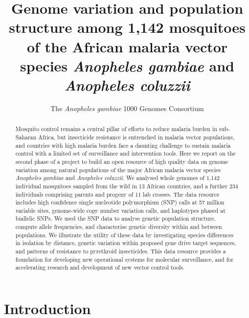 \documentclass[a4paper,11pt,abstracton,hidelinks]{scrartcl}
\title{
Genome variation and population structure among 1,142 mosquitoes of the African malaria vector species \emph{Anopheles gambiae} and \emph{Anopheles coluzzii}
}
\author[1]{\small The \emph{Anopheles gambiae} 1000 Genomes Consortium}
\affil[1]{\footnotesize A list of consortium members appears at the end of the paper}
\begin{document}
\maketitle


\begin{abstract}


Mosquito control remains a central pillar of efforts to reduce malaria burden in sub-Saharan Africa, but insecticide resistance is entrenched in malaria vector populations, and countries with high malaria burden face a daunting challenge to sustain malaria control with a limited set of surveillance and intervention tools. 
%
Here we report on the second phase of a project to build an open resource of high quality data on genome variation among natural populations of the major African malaria vector species \textit{Anopheles gambiae} and \textit{Anopheles coluzzii}. 
%
We analysed whole genomes of 1,142 individual mosquitoes sampled from the wild in 13 African countries, and a further 234 individuals comprising parents and progeny of 11 lab crosses. 
%
The data resource includes high confidence single nucleotide polymorphism (SNP) calls at 57 million variable sites, genome-wide copy number variation calls, and haplotypes phased at biallelic SNPs.
%
We used the SNP data to analyse genetic population structure, compute allele frequencies, and characterise genetic diversity within and between populations.
%
We illustrate the utility of these data by investigating species differences in isolation by distance, genetic variation within proposed gene drive target sequences, and patterns of resistance to pyrethroid insecticides.
%
This data resource provides a foundation for developing new operational systems for molecular surveillance, and for accelerating research and development of new vector control tools.

\end{abstract}


\section*{Introduction}
\end{document}
